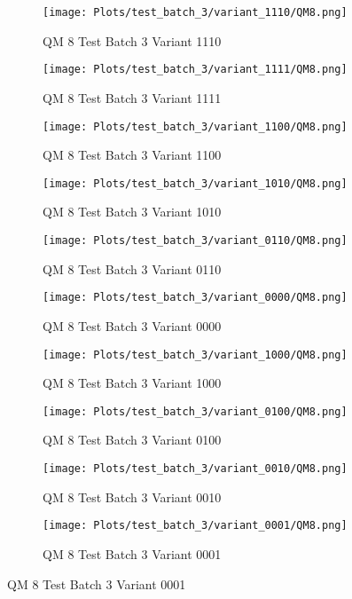\documentclass{DissertateFigs}
\begin{document}
\begin{figure}[t!]
    \begin{subfigure}{0.38\textwidth}
    \texttt{[image: Plots/test\_batch\_3/variant\_1110/QM8.png]}
    \caption{QM 8 Test Batch 3 Variant 1110}
    \end{subfigure}
    \begin{subfigure}{0.38\textwidth}
    \texttt{[image: Plots/test\_batch\_3/variant\_1111/QM8.png]}
    \caption{QM 8 Test Batch 3 Variant 1111}
    \end{subfigure}

\medskip

    \begin{subfigure}{0.38\textwidth}
    \texttt{[image: Plots/test\_batch\_3/variant\_1100/QM8.png]}
    \caption{QM 8 Test Batch 3 Variant 1100}
    \end{subfigure}
    \begin{subfigure}{0.38\textwidth}
    \texttt{[image: Plots/test\_batch\_3/variant\_1010/QM8.png]}
    \caption{QM 8 Test Batch 3 Variant 1010}
    \end{subfigure}

\medskip

    \begin{subfigure}{0.38\textwidth}
    \texttt{[image: Plots/test\_batch\_3/variant\_0110/QM8.png]}
    \caption{QM 8 Test Batch 3 Variant 0110}
    \end{subfigure}
    \begin{subfigure}{0.38\textwidth}
    \texttt{[image: Plots/test\_batch\_3/variant\_0000/QM8.png]}
    \caption{QM 8 Test Batch 3 Variant 0000}
    \end{subfigure}

\medskip

    \begin{subfigure}{0.38\textwidth}
    \texttt{[image: Plots/test\_batch\_3/variant\_1000/QM8.png]}
    \caption{QM 8 Test Batch 3 Variant 1000}
    \end{subfigure}
    \begin{subfigure}{0.38\textwidth}
    \texttt{[image: Plots/test\_batch\_3/variant\_0100/QM8.png]}
    \caption{QM 8 Test Batch 3 Variant 0100}
    \end{subfigure}

\medskip

    \begin{subfigure}{0.38\textwidth}
    \texttt{[image: Plots/test\_batch\_3/variant\_0010/QM8.png]}
    \caption{QM 8 Test Batch 3 Variant 0010}
    \end{subfigure}
    \begin{subfigure}{0.38\textwidth}
    \texttt{[image: Plots/test\_batch\_3/variant\_0001/QM8.png]}
    \caption{QM 8 Test Batch 3 Variant 0001}
    \end{subfigure}


\end{figure}
\end{document}
